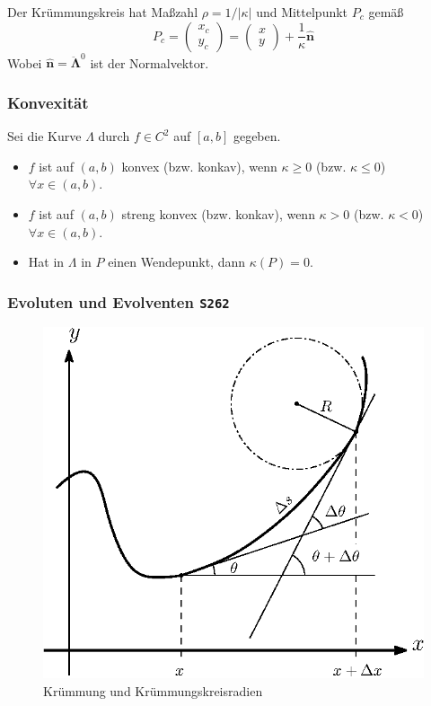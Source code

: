 \documentclass[a4paper, twocolumn]{article}
\numberwithin{equation}{subsection}
\renewcommand{\vec}[1]{\ensuremath{\bm{#1}}}
\newcommand{\brpage}[1]{\textcolor{red!70!black}{\small\texttt{S#1}}}
\begin{document}
Der Kr\"ummungskreis hat Ma{\ss}zahl \(\rho = 1/|\kappa|\) und Mittelpunkt \(P_c\) gem\"a\ss
\[
    P_c = \begin{pmatrix} x_c \\ y_c \end{pmatrix} 
    = \begin{pmatrix} x \\ y \end{pmatrix} + \frac{1}{\kappa} \vec{\hat{n}}
\]
Wobei \(\vec{\hat{n}} = \vec{\ddot{\Lambda}}^0\) ist der Normalvektor.

\subsubsection{Konvexit\"at}
Sei die Kurve \(\Lambda\) durch \(f \in C^2\) auf \([a,b]\) gegeben.
\begin{itemize}
    \item \(f\) ist auf \((a,b)\) konvex (bzw. konkav), wenn \(\kappa \geq 0\) (bzw. \(\kappa \leq 0\)) \(\forall x \in (a,b)\).
    \item \(f\) ist auf \((a,b)\) streng konvex (bzw. konkav), wenn \(\kappa > 0\) (bzw. \(\kappa < 0\)) \(\forall x \in (a,b)\).
    \item Hat in \(\Lambda\) in \(P\) einen Wendepunkt, dann \(\kappa(P) = 0\).
\end{itemize}

\subsubsection{Evoluten und Evolventen \brpage{262}}


\begin{figure}[h]
\centering
\includegraphics[width=.8\linewidth]{fig/plane-curvature}
\caption{Kr\"ummung und Kr\"ummungskreisradien}
\label{fig:plane-curvature}
\end{figure}
\end{document}
